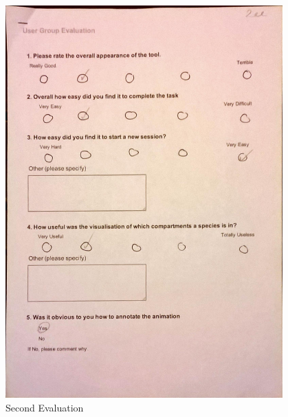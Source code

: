\begin{figure}[h!]
    \centering
    \includegraphics[width=0.95\textwidth]{images/user_eval/user_eval_9.jpg}
    \caption{Second Evaluation}
\end{figure}

